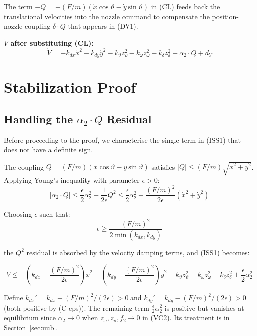 \documentclass[11pt,a4paper]{article}
\theoremstyle{plain}
\theoremstyle{remark}
\newcommand{\vth}{\vartheta}
\newcommand{\zth}{z_{\vth}}
\newcommand{\zom}{z_{\omega}}
\newcommand{\zdel}{z_{\delta}}
\begin{document}
The term $-Q = -(F/m)(\dot x\cos\vth - \dot y\sin\vth)$ in (CL) feeds back the translational velocities into the nozzle command to compensate the position-nozzle coupling $\delta\cdot Q$ that appears in (DV1).

\textbf{$\dot V$ after substituting (CL):}
\begin{equation}
  \dot V = -k_{dx}\dot x^2 - k_{dy}\dot y^2 - k_\vth \zth^2 - k_\omega\zom^2 - k_\delta\zdel^2 + \alpha_2\cdot Q + \bar{d}_Y
  \tag{ISS1}
\end{equation}

\section{Stabilization Proof}

\subsection{Handling the \texorpdfstring{$\alpha_2 \cdot Q$}{alpha2 Q} Residual}

Before proceeding to the proof, we characterise the single term in (ISS1) that does not have a definite sign.

The coupling $Q = (F/m)(\dot x\cos\vth - \dot y\sin\vth)$ satisfies $|Q| \leq (F/m)\sqrt{\dot x^2 + \dot y^2}$. Applying Young's inequality with parameter $\epsilon > 0$:
\[
  |\alpha_2\cdot Q| \leq \frac{\epsilon}{2}\alpha_2^2 + \frac{1}{2\epsilon}Q^2 \leq \frac{\epsilon}{2}\alpha_2^2 + \frac{(F/m)^2}{2\epsilon}(\dot x^2 + \dot y^2)
\]

Choosing $\epsilon$ such that:
\begin{equation}
  \epsilon \geq \frac{(F/m)^2}{2\min(k_{dx}, k_{dy})}
  \tag{C-eps}
\end{equation}

the $Q^2$ residual is absorbed by the velocity damping terms, and (ISS1) becomes:

\begin{equation}
  \dot V \leq -\!\left(k_{dx} - \frac{(F/m)^2}{2\epsilon}\right)\!\dot x^2 - \!\left(k_{dy} - \frac{(F/m)^2}{2\epsilon}\right)\!\dot y^2
  - k_\vth \zth^2 - k_\omega\zom^2 - k_\delta\zdel^2 + \frac{\epsilon}{2}\alpha_2^2
  \tag{ISS2}
\end{equation}

Define $k_{dx}' = k_{dx} - (F/m)^2/(2\epsilon) > 0$ and $k_{dy}' = k_{dy} - (F/m)^2/(2\epsilon) > 0$ (both positive by (C-eps)). The remaining term $\tfrac{\epsilon}{2}\alpha_2^2$ is positive but vanishes at equilibrium since $\alpha_2 \to 0$ when $\zom, \zth, f_2 \to 0$ in (VC2). Its treatment is in Section~\ref{sec:uub}.
\end{document}
